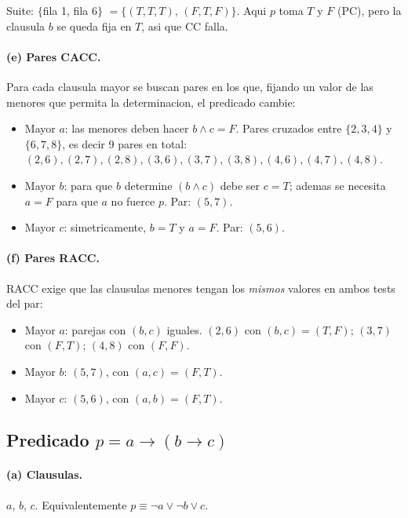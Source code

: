 \documentclass[12pt,a4paper]{article}
\begin{document}
Suite: $\{$fila 1, fila 6$\}$ $=\{(T,T,T),\,(F,T,F)\}$. Aqui $p$ toma $T$ y $F$ (PC), pero la
clausula $b$ se queda fija en $T$, asi que CC falla.

\paragraph{(e) Pares CACC.} Para cada clausula mayor se buscan pares en los que, fijando un valor
de las menores que permita la determinacion, el predicado cambie:

\begin{itemize}
  \item Mayor $a$: las menores deben hacer $b \wedge c = F$. Pares cruzados entre
  $\{2,3,4\}$ y $\{6,7,8\}$, es decir 9 pares en total: $(2,6), (2,7), (2,8), (3,6), (3,7),
  (3,8), (4,6), (4,7), (4,8)$.
  \item Mayor $b$: para que $b$ determine $(b\wedge c)$ debe ser $c=T$; ademas se necesita
  $a=F$ para que $a$ no fuerce $p$. Par: $(5,7)$.
  \item Mayor $c$: simetricamente, $b=T$ y $a=F$. Par: $(5,6)$.
\end{itemize}

\paragraph{(f) Pares RACC.} RACC exige que las clausulas menores tengan los \emph{mismos} valores
en ambos tests del par:

\begin{itemize}
  \item Mayor $a$: parejas con $(b,c)$ iguales. $(2,6)$ con $(b,c)=(T,F)$; $(3,7)$ con $(F,T)$;
  $(4,8)$ con $(F,F)$.
  \item Mayor $b$: $(5,7)$, con $(a,c)=(F,T)$.
  \item Mayor $c$: $(5,6)$, con $(a,b)=(F,T)$.
\end{itemize}

\subsection{Predicado $p = a \rightarrow (b \rightarrow c)$}

\paragraph{(a) Clausulas.} $a$, $b$, $c$. Equivalentemente $p \equiv \neg a \vee \neg b \vee c$.
\end{document}
